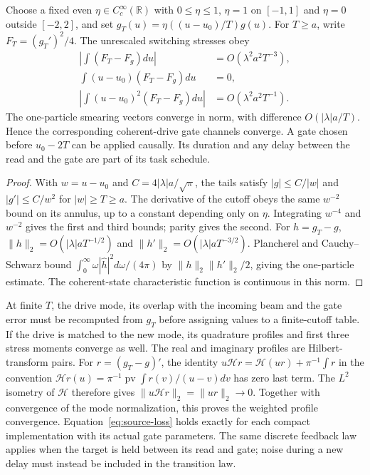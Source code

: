 \begin{proposition}\label{prop:compact}
Choose a fixed even $\eta\in C_c^\infty(\mathbb R)$ with $0\le\eta\le1$,
$\eta=1$ on $[-1,1]$ and $\eta=0$ outside $[-2,2]$, and set
$g_T(u)=\eta((u-u_0)/T)g(u)$. For $T\ge a$, write $F_T=(g_T')^2/4$.
The unrescaled switching stresses obey
\begin{align}
 \left|\int(F_T-F_g)du\right|&=O(\lambda^2a^2T^{-3}),\nonumber\\
 \int(u-u_0)(F_T-F_g)du&=0,\nonumber\\
 \left|\int(u-u_0)^2(F_T-F_g)du\right|&=O(\lambda^2a^2T^{-1}).
 \label{eq:compact-moments}
\end{align}
The one-particle smearing vectors converge in norm, with difference
$O(|\lambda|a/T)$. Hence the corresponding coherent-drive gate channels converge.
A gate chosen before $u_0-2T$ can be applied causally. Its duration and any delay
between the read and the gate are part of its task schedule.
\end{proposition}
\begin{proof}
With $w=u-u_0$ and $C=4|\lambda|a/\sqrt\pi$, the tails satisfy
$|g|\le C/|w|$ and $|g'|\le C/w^2$ for $|w|\ge T\ge a$.
The derivative of the cutoff obeys the same $w^{-2}$ bound on its annulus,
up to a constant depending only on $\eta$. Integrating $w^{-4}$ and $w^{-2}$
gives the first and third bounds; parity gives the second.
For $h=g_T-g$, $\|h\|_2=O(|\lambda|aT^{-1/2})$ and
$\|h'\|_2=O(|\lambda|aT^{-3/2})$. Plancherel and Cauchy--Schwarz bound
$\int_0^\infty\omega|\hat h|^2d\omega/(4\pi)$ by
$\|h\|_2\|h'\|_2/2$, giving the one-particle estimate.
The coherent-state characteristic function is continuous in this norm.
\end{proof}

At finite $T$, the drive mode, its overlap with the incoming beam and the gate error
must be recomputed from $g_T$ before assigning values to a finite-cutoff table.
If the drive is matched to the new mode, its
quadrature profiles and first three stress moments converge as well. The real and
imaginary profiles are Hilbert-transform pairs. For $r=(g_T-g)'$, the identity
$u\mathcal Hr=\mathcal H(ur)+\pi^{-1}\int r$ in the convention
$\mathcal Hr(u)=\pi^{-1}\operatorname{pv}\int r(v)/(u-v)dv$ has zero last term.
The $L^2$ isometry of $\mathcal H$ therefore gives
$\|u\mathcal Hr\|_2=\|ur\|_2\to0$. Together with convergence of the mode
normalization, this proves the weighted profile convergence.
Equation~\eqref{eq:source-loss} holds exactly for each compact
implementation with its actual gate parameters. The same discrete feedback law
applies when the target is held between its read and gate; noise during a new delay
must instead be included in the transition law.

